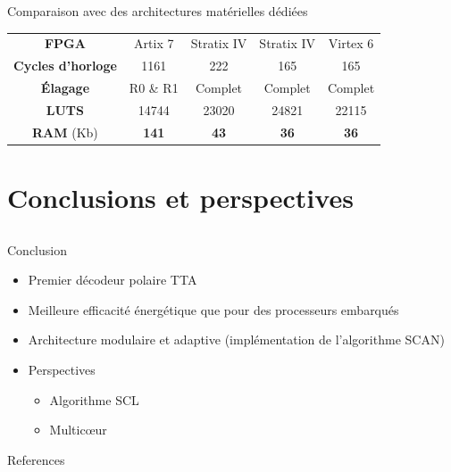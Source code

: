 \begin{frame}[c]{Comparaison avec des architectures matérielles dédiées}
{\begin{table}
{{\begin{tabular}{c|c|c|c|c}
          \textbf{FPGA}         &  Artix 7       & Stratix IV            & Stratix IV         & Virtex 6             \\
          \textbf{Cycles d'horloge}   &  1161          & 222                   & 165                & 165                  \\
          \textbf{\'Elagage}        &  R0 \& R1      & Complet                  & Complet               & Complet                  \\
          \textbf{LUTS}           &  14744         & 23020                 & 24821              & 22115                \\
          \textbf{RAM} (Kb)       &  \textbf{141}  & \textbf{43}           & \textbf{36}        & \textbf{36}          \\


        \end{tabular}
      }}
      \end{table}
    }
\end{frame}

\section{Conclusions et perspectives}
\subsection*{}

\begin{frame}[c]{Conclusion}

  \begin{itemize}
    \item<+-> Premier décodeur polaire TTA
    \vspace{0.3cm}
    \item<+-> Meilleure efficacité énergétique que pour des processeurs embarqués
    \vspace{0.3cm}
    \item<+-> Architecture modulaire et adaptive (implémentation de l'algorithme SCAN)
    \vspace{0.3cm}
    \item<+-> Perspectives
    \begin{itemize}
      \item<+-> Algorithme SCL
      \item<+-> Multicœur
    \end{itemize}
  \end{itemize}

\end{frame}

\begin{frame}[allowframebreaks]{References}
\printbibliography
\end{frame}
